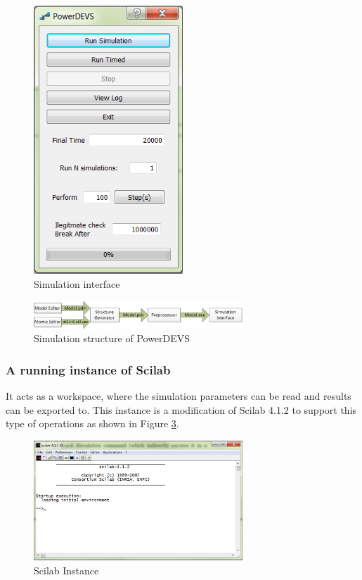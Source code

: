 \documentclass[titlepage]{article}%
\begin{document}
\begin{figure}[h!]
  \centering
    \includegraphics[width=0.5\textwidth]{Fig8.png}
    \caption{Simulation interface}
    \label{sim_int}
\end{figure}


\begin{figure}[h!]
  \centering
    \includegraphics[width=0.7\textwidth]{Fig9.png}
    \caption{Simulation structure of PowerDEVS}
    \label{sim_st}
\end{figure}


 
\subsubsection{A running instance of Scilab}

It acts as a workspace, where the simulation parameters can be read and results can be exported to. This instance is a modification of Scilab 4.1.2 to support this type of operations as shown in Figure \ref{sci_in}.




\begin{figure}[h!]
  \centering
    \includegraphics[width=0.7\textwidth]{Fig10.png}
    \caption{Scilab Instance}
    \label{sci_in}
\end{figure}
\end{document}
